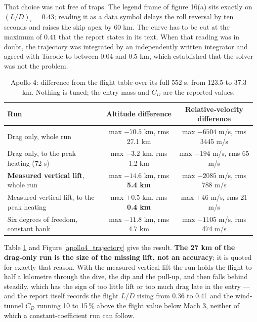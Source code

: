 \documentclass[11pt,a4paper]{article}
\begin{document}
That choice was not free of traps. The legend frame of figure 16(a) sits exactly on
$(L/D)_v = 0.43$; reading it as a data symbol delays the roll reversal by ten seconds and
raises the skip apex by 60 km. The curve has to be cut at the maximum of $0.41$ that the
report states in its text. When that reading was in doubt, the trajectory was integrated
by an independently written integrator and agreed with Tacode to between 0.04 and 0.5 km,
which established that the solver was not the problem.

\begin{table}[h]
\caption{Apollo 4: difference from the flight table over its full 552 s, from 123.5 to
37.3 km. Nothing is tuned; the entry mass and $C_D$ are the reported values.}
\label{apollo4_results}
\begin{center}
\footnotesize
\begin{tabular}{l|c|c}
\hline \hline
Run & Altitude difference & Relative-velocity difference \\
\hline
Drag only, whole run & max $-70.5$ km, rms 27.1 km & max $-6504$ m/s, rms 3445 m/s \\
Drag only, to the peak heating (72 s) & max $-3.2$ km, rms 1.2 km & max $-194$ m/s, rms 65 m/s \\
\textbf{Measured vertical lift}, whole run & max $-14.6$ km, rms \textbf{5.4 km} & max $-2085$ m/s, rms 788 m/s \\
Measured vertical lift, to the peak heating & max $+0.5$ km, rms \textbf{0.4 km} & max $+46$ m/s, rms 21 m/s \\
Six degrees of freedom, constant bank & max $-11.8$ km, rms 4.7 km & max $-1105$ m/s, rms 474 m/s \\
\hline \hline
\end{tabular}
\end{center}
\end{table}

Table \ref{apollo4_results} and Figure \ref{apollo4_trajectory} give the result.
\textbf{The 27 km of the drag-only run is the size of the missing lift, not an accuracy};
it is quoted for exactly that reason. With the measured vertical lift the run holds the
flight to half a kilometre through the dive, the dip and the pull-up, and then falls
behind steadily, which has the sign of too little lift or too much drag late in the entry
--- and the report itself records the flight $L/D$ rising from 0.36 to 0.41 and the
wind-tunnel $C_D$ running 10 to 15\,\% above the flight value below Mach 3, neither of
which a constant-coefficient run can follow.
\end{document}
